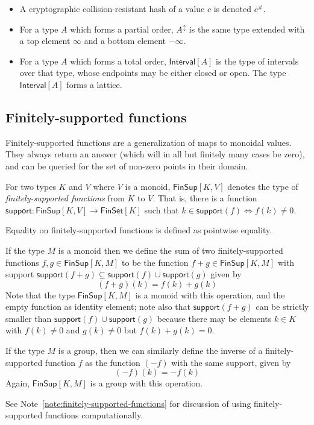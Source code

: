 \documentclass[a4paper]{article}
\newcounter{note}
\newcommand{\s}{\textsf}  %
\newcommand{\msf}[1]{\ensuremath{\mathsf{#1}}}
\newcommand{\hash}[1]{\ensuremath{#1^{\#}}}
\newcommand{\FinSet}[1]{\ensuremath{\s{FinSet}[#1]}}
\newcommand{\Interval}[1]{\ensuremath{\s{Interval}[#1]}}
\newcommand{\extended}[1]{#1^\updownarrow}
\newcommand{\FinSup}[2]{\ensuremath{\s{FinSup}[#1,#2]}}
\newcommand{\support}{\msf{support}}
\begin{document}
\begin{itemize}
\item A cryptographic collision-resistant hash of a value $c$ is denoted $\hash{c}$.

\item For a type $A$ which forms a partial order, $\extended{A}$ is the same
  type extended with a top element $\infty$ and a bottom element $-\infty$.

\item For a type $A$ which forms a total order,  $\Interval{A}$ is the type
  of intervals over that type, whose endpoints may be either closed or open.
  The type $\Interval{A}$ forms a lattice.
\end{itemize}

\subsection {Finitely-supported functions}
\label{sec:fsfs}

Finitely-supported functions are a generalization of maps to monoidal values.
They always return an answer (which will in all but finitely many cases be
zero), and can be queried for the set of non-zero points in their domain.

For two types $K$ and $V$ where $V$ is a monoid, $\FinSup{K}{V}$ denotes the type of
\textit{finitely-supported functions} from $K$ to $V$. That is, there is a
function $\support : \FinSup{K}{V} \rightarrow \FinSet{K}$ such that
$k \in \support(f) \Leftrightarrow f(k) \neq 0$.

Equality on finitely-supported functions is defined as pointwise equality.

If the type $M$ is a monoid then we define the sum of two finitely-supported
functions
$f, g \in \FinSup{K}{M}$ to be the function $f+g \in \FinSup{K}{M}$ with
support $\support (f+g) \subseteq \support(f) \cup \support(g)$ given by
\[(f+g)(k) = f(k) + g(k) \]
Note that the type $\FinSup{K}{M}$ is a monoid with this operation,
and the empty function as identity element; note also that $\support
(f+g)$ can be strictly smaller than $\support(f) \cup \support(g)$
because there may be elements $k \in K$ with $f(k) \ne 0$ and $g(k)
\ne 0$ but $f(k) + g(k) = 0$.

If the type $M$ is a group, then we can
similarly define the inverse of a finitely-supported function $f$ as
the function $(-f)$ with the same support, given by
\[ (-f)(k) = -f(k) \]
Again, $\FinSup{K}{M}$ is a group with this operation.

See Note~\ref{note:finitely-supported-functions} for discussion of using
finitely-supported functions computationally.
\end{document}
